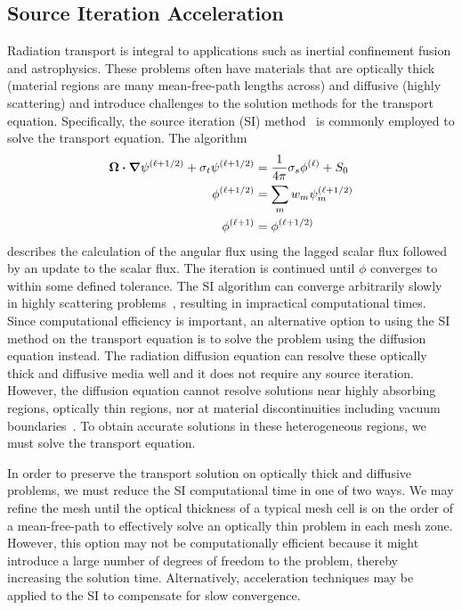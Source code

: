 \documentclass{article}
\begin{document}
\subsection{Source Iteration Acceleration}
\label{sec:SourceIterationAccelerationIntro}
Radiation transport is integral to applications such as inertial confinement fusion and astrophysics. These problems often have materials that are optically thick (material regions are many mean-free-path lengths across) and diffusive (highly scattering) and introduce challenges to the solution methods for the transport equation. Specifically, the source iteration (SI) method~\cite{Lewis_Comp_Methods_Neu_Trans} is commonly employed to solve the transport equation. The algorithm
\begin{subequations}
\begin{flalign}
\bm{\Omega} \bm{\cdot} \bm{\nabla} \psi^{(\ell+1/2)} + \sigma_t \psi^{(\ell+1/2)} & = \frac{1}{4 \pi} \sigma_s \phi^{(\ell)} + S_0 \label{eq:DSASITransport}\\
\phi^{(\ell+1/2)} & = \sum_m w_m \psi^{(\ell+1/2)}_m \label{eq:DSASIPhiHalf} \\
\phi^{(\ell+1)} & = \phi^{(\ell+1/2)}
\end{flalign}
\label{eqs:SourceIteration}
\end{subequations}
%
\noindent describes the calculation of the angular flux using the lagged scalar flux followed by an update to the scalar flux. The iteration is continued until $\phi$ converges to within some defined tolerance. The SI algorithm can converge arbitrarily slowly in highly scattering problems~\cite{LarsenStableDSATheory}, resulting in impractical computational times. Since computational efficiency is important, an alternative option to using the SI method on the transport equation is to solve the problem using the diffusion equation instead. The radiation diffusion equation can resolve these optically thick and diffusive media well and it does not require any source iteration. However, the diffusion equation cannot resolve solutions near highly absorbing regions, optically thin regions, nor at material discontinuities including vacuum boundaries~\cite{D&H}. To obtain accurate solutions in these heterogeneous regions, we must solve the transport equation.

In order to preserve the transport solution on optically thick and diffusive problems, we must reduce the SI computational time in one of two ways. We may refine the mesh until the optical thickness of a typical mesh cell is on the order of a mean-free-path to effectively solve an optically thin problem in each mesh zone. However, this option may not be computationally efficient because it might introduce a large number of degrees of freedom to the problem, thereby increasing the solution time. Alternatively, acceleration techniques may be applied to the SI to compensate for slow convergence.
\end{document}
